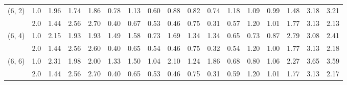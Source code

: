 \begin{tabular}{llrrrrrrrrrrrrrrr}
(6, 2) & 1.0 &   1.96 & 1.74 & 1.86 &    0.78 & 1.13 & 0.60 &    0.88 & 0.82 & 0.74 & 1.18 & 1.09 & 0.99 & 1.48 & 3.18 & 3.21 \\
       & 2.0 &   1.44 & 2.56 & 2.70 &    0.40 & 0.67 & 0.53 &    0.46 & 0.75 & 0.31 & 0.57 & 1.20 & 1.01 & 1.77 & 3.13 & 2.13 \\
(6, 4) & 1.0 &   2.15 & 1.93 & 1.93 &    1.49 & 1.58 & 0.73 &    1.69 & 1.34 & 1.34 & 0.65 & 0.73 & 0.87 & 2.79 & 3.08 & 2.41 \\
       & 2.0 &   1.44 & 2.56 & 2.60 &    0.40 & 0.65 & 0.54 &    0.46 & 0.75 & 0.32 & 0.54 & 1.20 & 1.00 & 1.77 & 3.13 & 2.18 \\
(6, 6) & 1.0 &   2.31 & 1.98 & 2.00 &    1.33 & 1.50 & 1.04 &    2.10 & 1.24 & 1.86 & 0.68 & 0.80 & 1.06 & 2.27 & 3.65 & 3.59 \\
       & 2.0 &   1.44 & 2.56 & 2.70 &    0.40 & 0.65 & 0.53 &    0.46 & 0.75 & 0.31 & 0.59 & 1.20 & 1.01 & 1.77 & 3.13 & 2.17 \\
\bottomrule
\end{tabular}
